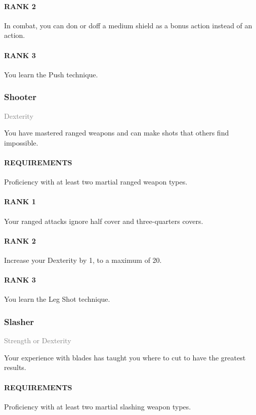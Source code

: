 \paragraph{RANK 2} In combat, you can don or doff a medium shield as a bonus action instead of an action.
\paragraph{RANK 3} You learn the Push technique.

\subsubsection{Shooter} \label{feat::shooter}
\small{\textcolor{gray}{Dexterity}}

\normalsize
You have mastered ranged weapons and can make shots that others find impossible.
\paragraph{REQUIREMENTS} Proficiency with at least two martial ranged weapon types.
\paragraph{RANK 1} Your ranged attacks ignore half cover and three-quarters covers.
\paragraph{RANK 2} Increase your Dexterity by 1, to a maximum of 20.
\paragraph{RANK 3} You learn the Leg Shot technique.

\subsubsection{Slasher} \label{feat::slasher}
\small{\textcolor{gray}{Strength or Dexterity}}

\normalsize
Your experience with blades has taught you where to cut to have the greatest results.
\paragraph{REQUIREMENTS} Proficiency with at least two martial slashing weapon types.
